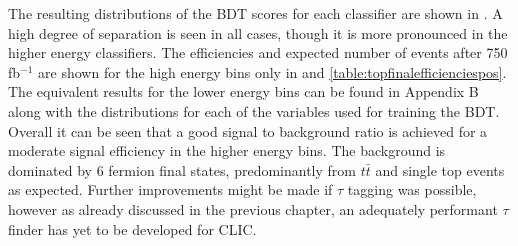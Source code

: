 The resulting distributions of the \ac{BDT} scores for each classifier are shown in . A high degree of separation is seen in all cases, though it is more pronounced in the higher energy classifiers. The efficiencies and expected number of events after 750 fb$^{-1}$ are shown for the high energy bins only in  and \ref{table:topfinalefficienciespos}. The equivalent results for the lower energy bins can be found in Appendix B along with the distributions for each of the variables used for training the \ac{BDT}. Overall it can be seen that a good signal to background ratio is achieved for a moderate signal efficiency in the higher energy bins. The background is dominated by 6 fermion final states, predominantly from $t\bar{t}$ and single top events as expected. Further improvements might be made if $\tau$ tagging was possible, however as already discussed in the previous chapter, an adequately performant $\tau$ finder has yet to be developed for \ac{CLIC}. 

